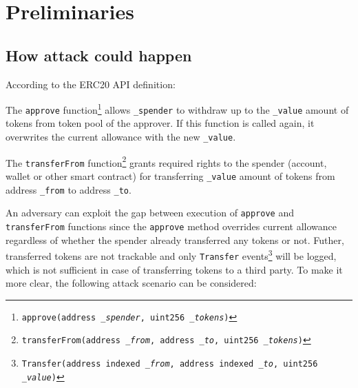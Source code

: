 
\section{Preliminaries}

\subsection{How attack could happen}

According to the ERC20 API definition:

\begin{compactlist}
\item The \texttt{approve} function\footnote{\texttt{approve(address \textit{\_spender}, uint256 \textit{\_tokens})}} allows \texttt{\_spender} to withdraw up to the \texttt{\_value} amount of tokens from token pool of the approver. If this function is called again, it overwrites the current allowance with the new \texttt{\_value}.
\item The \texttt{transferFrom} function\footnote{\texttt{transferFrom(address \textit{\_from}, address \textit{\_to}, uint256 \textit{\_tokens})}}  grants required rights to the spender (account, wallet or other smart contract) for transferring \texttt{\_value} amount of tokens from address \texttt{\_from} to address \texttt{\_to}.
\end{compactlist}

An adversary can exploit the gap between execution of \texttt{approve} and \texttt{transferFrom} functions since the \texttt{approve} method overrides current allowance regardless of whether the spender already transferred any tokens or not. Futher, transferred tokens are not trackable and only \texttt{Transfer} events\footnote{\texttt{Transfer(address indexed \textit{\_from}, address indexed \textit{\_to}, uint256 \textit{\_value})}} will be logged, which is not sufficient in case of transferring tokens to a third party. To make it more clear, the following attack scenario can be considered:


